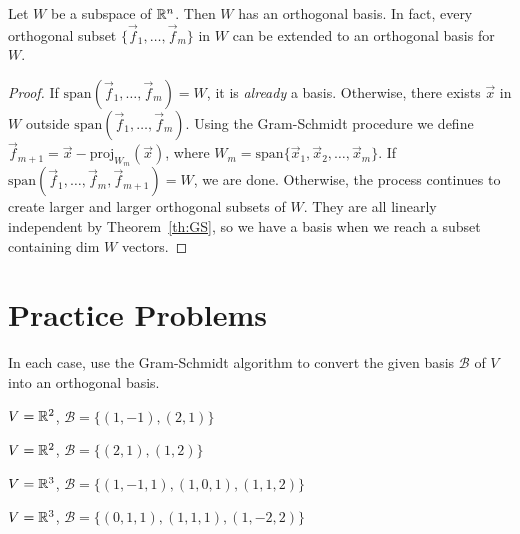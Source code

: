 \documentclass{ximera}
\begin{document}
\begin{theorem}\label{023635}
Let $W$ be a subspace of $\mathbb{R}^n$.  Then  $W$ has an orthogonal basis.  In fact, every orthogonal subset $\{\vec{f}_{1}, \dots , \vec{f}_{m}\}$ in $W$ can be extended to an orthogonal basis for $W$.
\end{theorem}

\begin{proof}
If $\mbox{span}\left(\vec{f}_{1}, \dots , \vec{f}_{m}\right) = W$, it is \textit{already} a basis. Otherwise, there exists $\vec{x}$ in $W$ outside $\mbox{span}\left(\vec{f}_{1}, \dots , \vec{f}_{m}\right)$. Using the Gram-Schmidt procedure we define $\vec{f}_{m+1} = \vec{x} - \mbox{proj}_{W_{m}}(\vec{x})$, where $W_m = \mbox{span}\{\vec{x}_{1},\vec{x}_{2},\ldots,\vec{x}_{m}\}$. If $\mbox{span}\left(\vec{f}_{1}, \dots, \vec{f}_{m}, \vec{f}_{m+1}\right) = W$, we are done. Otherwise, the process continues to create larger and larger orthogonal subsets of $W$. They are all linearly independent by Theorem~\ref{th:GS}, so we have a basis when we reach a subset containing \mbox{dim} $W$ vectors.
\end{proof}


\section*{Practice Problems}

\begin{problem}
In each case, use the Gram-Schmidt algorithm to convert the given basis $\mathcal{B}$ of $V$ into an orthogonal basis.  

\begin{problem}\label{GS1}
$V = \mathbb{R}^2$, $\mathcal{B} = \{(1, -1), (2, 1)\}$
\end{problem}
\begin{problem}
$V = \mathbb{R}^2$, $\mathcal{B} = \{(2, 1), (1, 2)\}$
\end{problem}
\begin{problem}
$V = \mathbb{R}^3$, $\mathcal{B} = \{(1, -1, 1), (1, 0, 1), (1, 1, 2)\}$

\end{problem}
\begin{problem}
$V = \mathbb{R}^3$, $\mathcal{B} = \{(0, 1, 1), (1, 1, 1), (1, -2, 2)\}$
\end{problem}
\end{problem}
\end{document}
